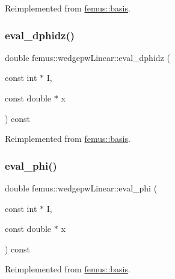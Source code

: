 Reimplemented from \mbox{\hyperlink{classfemus_1_1basis_a2819fac9aae797156b9efec8a0b85cc1}{femus\+::basis}}.

\mbox{\label{classfemus_1_1wedgepw_linear_a2a7e6c2af74aad5a0ad1258598507fa3}} 
\subsubsection{\texorpdfstring{eval\+\_\+dphidz()}{eval\_dphidz()}}
{\footnotesize\ttfamily double femus\+::wedgepw\+Linear\+::eval\+\_\+dphidz (\begin{DoxyParamCaption}\item[{const int $\ast$}]{I,  }\item[{const double $\ast$}]{x }\end{DoxyParamCaption}) const\hspace{0.3cm}{\ttfamily [virtual]}}



Reimplemented from \mbox{\hyperlink{classfemus_1_1basis_affd9927f6e25e264108219d862b8cb3d}{femus\+::basis}}.

\mbox{\label{classfemus_1_1wedgepw_linear_ad503d897290fadcf86d96fa105521af7}} 
\subsubsection{\texorpdfstring{eval\+\_\+phi()}{eval\_phi()}}
{\footnotesize\ttfamily double femus\+::wedgepw\+Linear\+::eval\+\_\+phi (\begin{DoxyParamCaption}\item[{const int $\ast$}]{I,  }\item[{const double $\ast$}]{x }\end{DoxyParamCaption}) const\hspace{0.3cm}{\ttfamily [virtual]}}



Reimplemented from \mbox{\hyperlink{classfemus_1_1basis_a89b0797cdccffae5ff6d059b32016ae5}{femus\+::basis}}.

